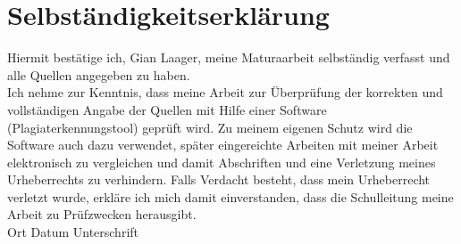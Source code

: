 \documentclass[11pt,DIV=10,final]{scrreprt} %
\begin{document}
\begin{appendix}
{\vspace*{3ex}
{\noindent \large \bfseries src/newtons\_method.rs}


\vspace*{3ex}
{\noindent \large \bfseries src/plot.rs}


\vspace*{3ex}
{\noindent \large \bfseries src/potentials.rs}


\vspace*{3ex}
{\noindent \large \bfseries src/tui.rs}


\vspace*{3ex}
{\noindent \large \bfseries src/turning\_points.rs}


\vspace*{3ex}
{\noindent \large \bfseries src/utils.rs}


\vspace*{3ex}
{\noindent \large \bfseries src/wave\_function\_builder.rs}


\vspace*{3ex}
{\noindent \large \bfseries src/wkb\_wave\_func.rs}


\end{appendix}



%
\chapter*{Selbständigkeitserklärung}
%
Hiermit bestätige ich, Gian Laager, meine Maturaarbeit selbständig verfasst und alle Quellen angegeben zu haben.\\\newline
Ich nehme zur Kenntnis, dass meine Arbeit zur Überprüfung der korrekten und vollständigen Angabe der Quellen mit Hilfe einer Software (Plagiaterkennungstool) geprüft wird. Zu meinem eigenen Schutz wird die Software auch dazu verwendet, später eingereichte Arbeiten mit meiner Arbeit elektronisch zu vergleichen und damit Abschriften und eine Verletzung meines Urheberrechts zu verhindern. Falls Verdacht besteht, dass mein Urheberrecht verletzt wurde, erkläre ich mich damit einverstanden, dass die Schulleitung meine Arbeit zu Prüfzwecken herausgibt.\\\newline
Ort\hspace{4cm} Datum\hspace{4cm}  Unterschrift
%
\end{document}
